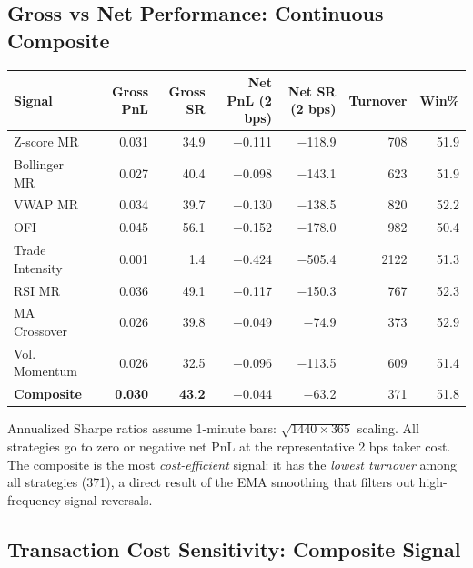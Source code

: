 \documentclass[11pt, a4paper]{article}
\begin{document}
\subsection{Gross vs Net Performance: Continuous Composite}

\begin{center}
{\footnotesize
\begin{tabular}{lrrrrrr}
\toprule
\textbf{Signal} & \textbf{Gross PnL}
  & \textbf{Gross SR} & \textbf{Net PnL (2 bps)}
  & \textbf{Net SR (2 bps)} & \textbf{Turnover} & \textbf{Win\%} \\
\midrule
Z-score MR     & 0.031 & 34.9 & $-$0.111 & $-$118.9 & 708 & 51.9 \\
Bollinger MR   & 0.027 & 40.4 & $-$0.098 & $-$143.1 & 623 & 51.9 \\
VWAP MR        & 0.034 & 39.7 & $-$0.130 & $-$138.5 & 820 & 52.2 \\
OFI            & 0.045 & 56.1 & $-$0.152 & $-$178.0 & 982 & 50.4 \\
Trade Intensity& 0.001 &  1.4 & $-$0.424 & $-$505.4 & 2122 & 51.3 \\
RSI MR         & 0.036 & 49.1 & $-$0.117 & $-$150.3 & 767 & 52.3 \\
MA Crossover   & 0.026 & 39.8 & $-$0.049 & $-$74.9  & 373 & 52.9 \\
Vol. Momentum  & 0.026 & 32.5 & $-$0.096 & $-$113.5 & 609 & 51.4 \\
\midrule
\textbf{Composite}& \textbf{0.030} & \textbf{43.2}
  & $-$0.044 & $-$63.2 & 371 & 51.8 \\
\bottomrule
\end{tabular}
} %
\end{center}

Annualized Sharpe ratios assume 1-minute bars: $\sqrt{1440 \times 365}$ scaling.
All strategies go to zero or negative net PnL at the representative 2 bps
taker cost.  The composite is the most \textit{cost-efficient} signal: it
has the \textit{lowest turnover} among all strategies (371), a direct result
of the EMA smoothing that filters out high-frequency signal reversals.

\subsection{Transaction Cost Sensitivity: Composite Signal}
\end{document}

